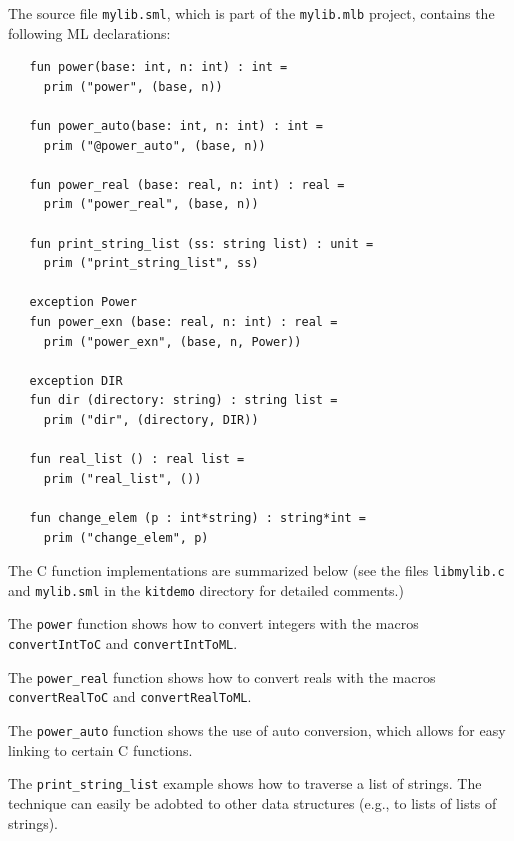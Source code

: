 \documentclass[12pt]{book}
\begin{document}
The source file \verb|mylib.sml|, which is part of the
\verb|mylib.mlb| project, contains the following ML declarations:
\begin{verbatim}
   fun power(base: int, n: int) : int = 
     prim ("power", (base, n))

   fun power_auto(base: int, n: int) : int = 
     prim ("@power_auto", (base, n))

   fun power_real (base: real, n: int) : real = 
     prim ("power_real", (base, n))

   fun print_string_list (ss: string list) : unit = 
     prim ("print_string_list", ss)

   exception Power
   fun power_exn (base: real, n: int) : real = 
     prim ("power_exn", (base, n, Power))

   exception DIR
   fun dir (directory: string) : string list = 
     prim ("dir", (directory, DIR))

   fun real_list () : real list = 
     prim ("real_list", ())

   fun change_elem (p : int*string) : string*int =
     prim ("change_elem", p)
\end{verbatim}

The C function implementations are summarized below (see the files
\verb|libmylib.c| and \verb|mylib.sml| in the {\tt kitdemo} directory
for detailed comments.)

\begin{example}\label{power.ex}
  The \texttt{power} function shows how to convert
  integers with the macros \texttt{convertIntToC} and
  \texttt{convertIntToML}.
\end{example}

\begin{example}\label{power_real.ex}
  The \texttt{power\_real} function shows how
  to convert reals with the macros \texttt{convertRealToC} and
  \texttt{convertRealToML}.
\end{example}

\begin{example}\label{power_auto.ex}
  The \texttt{power\_auto} function shows the
  use of auto conversion, which allows for easy linking to certain C
  functions.
\end{example}

\begin{example}\label{print_string_list.ex}
  The \texttt{print\_string\_list}
  example shows how to traverse a list of strings. The technique can
  easily be adobted to other data structures (e.g., to lists of lists
  of strings).
\end{example}
\end{document}

